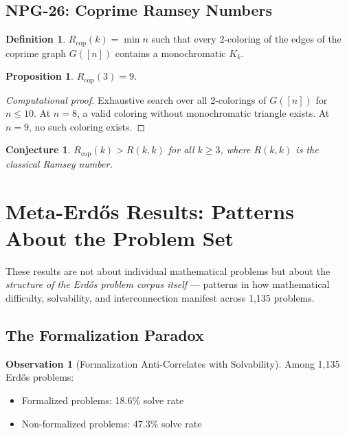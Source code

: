 \documentclass[11pt,a4paper]{article}
\newtheorem{proposition}[theorem]{Proposition}
\newtheorem{conjecture}[theorem]{Conjecture}
\theoremstyle{definition}
\newtheorem{definition}[theorem]{Definition}
\newtheorem{observation}[theorem]{Observation}
\theoremstyle{remark}
\begin{document}
\subsection{NPG-26: Coprime Ramsey Numbers}

\begin{definition}
$R_{\mathrm{cop}}(k) = \min n$ such that every 2-coloring of the edges
of the coprime graph $G([n])$ contains a monochromatic $K_k$.
\end{definition}

\begin{proposition}
$R_{\mathrm{cop}}(3) = 9$.
\end{proposition}

\begin{proof}[Computational proof]
Exhaustive search over all 2-colorings of $G([n])$ for $n \leq 10$.
At $n=8$, a valid coloring without monochromatic triangle exists.
At $n=9$, no such coloring exists.
\end{proof}

\begin{conjecture}
$R_{\mathrm{cop}}(k) > R(k,k)$ for all $k \geq 3$, where $R(k,k)$ is the
classical Ramsey number.
\end{conjecture}

\section{Meta-Erd\H{o}s Results: Patterns About the Problem Set}

These results are not about individual mathematical problems but about the
\emph{structure of the Erd\H{o}s problem corpus itself} --- patterns in how
mathematical difficulty, solvability, and interconnection manifest across
1,135 problems.

\subsection{The Formalization Paradox}

\begin{observation}[Formalization Anti-Correlates with Solvability]
Among 1,135 Erd\H{o}s problems:
\begin{itemize}[nosep]
\item Formalized problems: 18.6\% solve rate
\item Non-formalized problems: 47.3\% solve rate
\end{itemize}
\end{observation}
\end{document}
